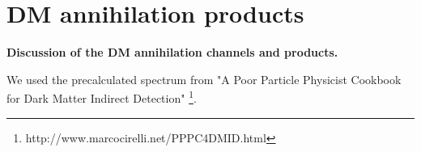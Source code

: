 \section{DM annihilation products}
\label{sec:DM}

\textbf{Discussion of the DM annihilation channels and products.}

We used the precalculated spectrum from "A Poor Particle Physicist Cookbook for Dark Matter Indirect Detection" \cite{Cirelli_2011}\footnote{http://www.marcocirelli.net/PPPC4DMID.html}.